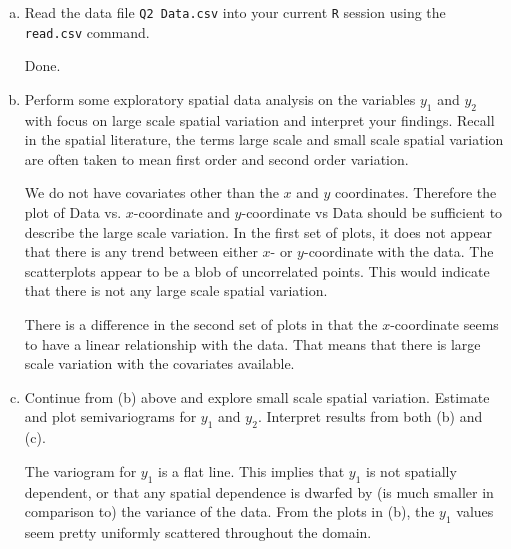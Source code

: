 \documentclass[letterpaper, 12pt]{article}
\begin{document}
\begin{enumerate}[(a)]
\item
Read the data file \texttt{Q2 Data.csv} into your current \texttt{R} session using the \texttt{read.csv} command.

\textsf{Done}.
\item
Perform some exploratory spatial data analysis on the variables $y_1$ and $y_2$ with focus on large scale spatial variation and interpret your findings. Recall in the spatial literature, the terms large scale and small scale spatial variation are often taken to mean first order and second order variation.



{\sf
We do not have covariates other than the $x$ and $y$ coordinates. Therefore the plot of Data vs. $x$-coordinate and $y$-coordinate vs Data should be sufficient to describe the large scale variation. In the first set of plots, it does not appear that there is any trend between either $x$- or $y$-coordinate with the data. The scatterplots appear to be a blob of uncorrelated points. This would indicate that there is not any large scale spatial variation.

There is a difference in the second set of plots in that the $x$-coordinate seems to have a linear relationship with the data. That means that there is large scale variation with the covariates available.}

\item
Continue from (b) above and explore small scale spatial variation. Estimate and plot semivariograms for $y_1$ and $y_2$. Interpret results from both (b) and (c).


{\sf
The variogram for $y_1$ is a flat line. This implies that $y_1$ is not spatially dependent, or that any spatial dependence is dwarfed by (is much smaller in comparison to) the variance of the data. From the plots in (b), the $y_1$ values seem pretty uniformly scattered throughout the domain.
 
}
\end{enumerate}
\end{document}
